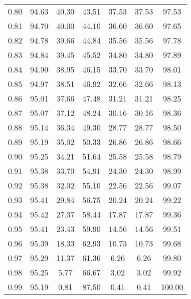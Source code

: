 \begin{tabular}{|c|c|c|c|c|c|c|}
      0.80 &     94.63 &     40.30 &      43.51 &   37.53 &      37.53 &         97.53 \\
      0.81 &     94.70 &     40.00 &      44.10 &   36.60 &      36.60 &         97.65 \\
      0.82 &     94.78 &     39.66 &      44.84 &   35.56 &      35.56 &         97.78 \\
      0.83 &     94.84 &     39.45 &      45.52 &   34.80 &      34.80 &         97.89 \\
      0.84 &     94.90 &     38.95 &      46.15 &   33.70 &      33.70 &         98.01 \\
      0.85 &     94.97 &     38.51 &      46.92 &   32.66 &      32.66 &         98.13 \\
      0.86 &     95.01 &     37.66 &      47.48 &   31.21 &      31.21 &         98.25 \\
      0.87 &     95.07 &     37.12 &      48.24 &   30.16 &      30.16 &         98.36 \\
      0.88 &     95.14 &     36.34 &      49.30 &   28.77 &      28.77 &         98.50 \\
      0.89 &     95.19 &     35.02 &      50.33 &   26.86 &      26.86 &         98.66 \\
      0.90 &     95.25 &     34.21 &      51.64 &   25.58 &      25.58 &         98.79 \\
      0.91 &     95.38 &     33.70 &      54.91 &   24.30 &      24.30 &         98.99 \\
      0.92 &     95.38 &     32.02 &      55.10 &   22.56 &      22.56 &         99.07 \\
      0.93 &     95.41 &     29.84 &      56.75 &   20.24 &      20.24 &         99.22 \\
      0.94 &     95.42 &     27.37 &      58.44 &   17.87 &      17.87 &         99.36 \\
      0.95 &     95.41 &     23.43 &      59.90 &   14.56 &      14.56 &         99.51 \\
      0.96 &     95.39 &     18.33 &      62.93 &   10.73 &      10.73 &         99.68 \\
      0.97 &     95.29 &     11.37 &      61.36 &    6.26 &       6.26 &         99.80 \\
      0.98 &     95.25 &      5.77 &      66.67 &    3.02 &       3.02 &         99.92 \\
      0.99 &     95.19 &      0.81 &      87.50 &    0.41 &       0.41 &        100.00 \\
\bottomrule
\end{tabular}
